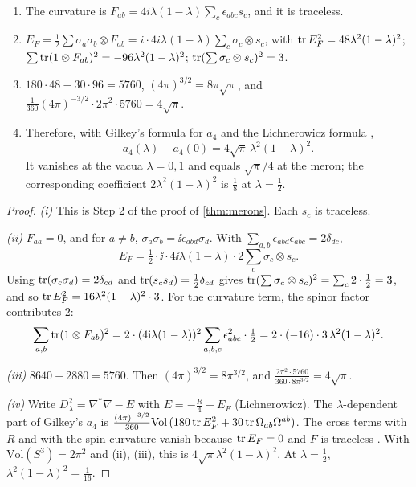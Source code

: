 \begin{theorem}\label{thm:a4}\ver\
\begin{enumerate}[label=(\roman*)]
\item The curvature is $F_{ab}=4i\lambda(1-\lambda)\sum_c\epsilon_{abc}s_c$, and it is traceless.
\item $E_F=\frac12\sum\sigma_a\sigma_b\otimes F_{ab}=i\cdot4i\lambda(1-\lambda)\sum_c\sigma_c\otimes s_c$, with $\operatorname{tr} E_F^2=48\lambda^2(1-\lambda)^2$; $\sum\operatorname{tr}(1\otimes F_{ab})^2=-96\lambda^2(1-\lambda)^2$; $\operatorname{tr}(\sum\sigma_c\otimes s_c)^2=3$.
\item $180\cdot48-30\cdot96=5760$, $(4\pi)^{3/2}=8\pi\sqrt\pi$, and $\frac1{360}(4\pi)^{-3/2}\cdot2\pi^2\cdot5760=4\sqrt\pi$.
\item Therefore, with Gilkey's formula for $a_4$ and the Lichnerowicz formula \ext,
\[
a_4(\lambda)-a_4(0)=4\sqrt\pi\,\lambda^2(1-\lambda)^2 .
\]
It vanishes at the vacua $\lambda=0,1$ and equals $\sqrt\pi/4$ at the meron; the corresponding coefficient $2\lambda^2(1-\lambda)^2$ is $\frac18$ at $\lambda=\frac12$.
\end{enumerate}
\end{theorem}
\begin{proof}
\emph{(i)} This is Step 2 of the proof of \cref{thm:merons}. Each $s_c$ is traceless.

\emph{(ii)} $F_{aa}=0$, and for $a\ne b$, $\sigma_a\sigma_b=\ii\epsilon_{abd}\sigma_d$. With $\sum_{a,b}\epsilon_{abd}\epsilon_{abc}=2\delta_{dc}$,
\[
E_F=\tfrac12\cdot\ii\cdot4\ii\lambda(1-\lambda)\cdot2\sum_c\sigma_c\otimes s_c .
\]
Using $\operatorname{tr}(\sigma_c\sigma_d)=2\delta_{cd}$ and $\operatorname{tr}(s_cs_d)=\frac12\delta_{cd}$ gives $\operatorname{tr}(\sum\sigma_c\otimes s_c)^2=\sum_c2\cdot\frac12=3$, and so $\operatorname{tr} E_F^2=16\lambda^2(1-\lambda)^2\cdot3$. For the curvature term, the spinor factor contributes $2$:
\[
\sum_{a,b}\operatorname{tr}(1\otimes F_{ab})^2=2\cdot(4\mathrm{i}\lambda(1-\lambda))^2\sum_{a,b,c}\epsilon_{abc}^2\cdot\tfrac12=2\cdot(-16)\cdot3\,\lambda^2(1-\lambda)^2 .
\]

\emph{(iii)} $8640-2880=5760$. Then $(4\pi)^{3/2}=8\pi^{3/2}$, and $\frac{2\pi^2\cdot5760}{360\cdot8\pi^{3/2}}=4\sqrt\pi$.

\emph{(iv)} Write $D_\lambda^2=\nabla^*\nabla-E$ with $E=-\frac R4-E_F$ (Lichnerowicz). The $\lambda$-dependent part of Gilkey's $a_4$ is $\frac{(4\pi)^{-3/2}}{360}\mathrm{Vol}\,(180\operatorname{tr} E_F^2+30\operatorname{tr}\Omega_{ab}\Omega^{ab})$. The cross terms with $R$ and with the spin curvature vanish because $\operatorname{tr} E_F=0$ and $F$ is traceless \ext. With $\mathrm{Vol}(S^3)=2\pi^2$ and (ii), (iii), this is $4\sqrt\pi\lambda^2(1-\lambda)^2$. At $\lambda=\frac12$, $\lambda^2(1-\lambda)^2=\frac1{16}$.
\end{proof}


